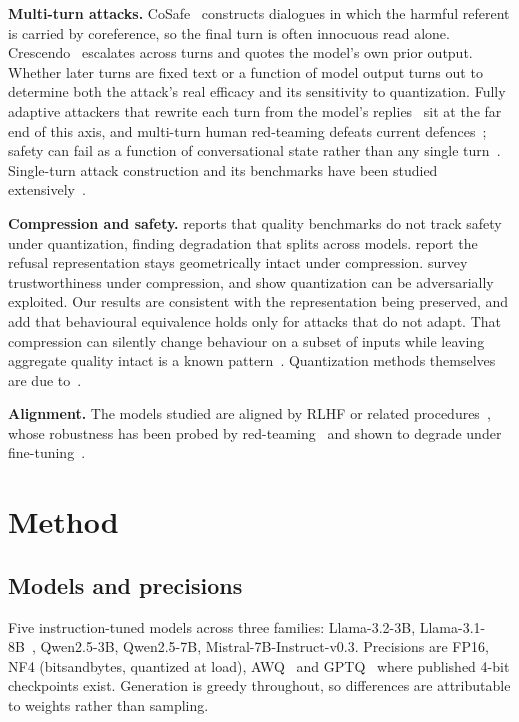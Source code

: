 \documentclass[10pt,twocolumn]{article}
\begin{document}
\textbf{Multi-turn attacks.} CoSafe~\citep{yu2024cosafe} constructs dialogues in
which the harmful referent is carried by coreference, so the final turn is often
innocuous read alone. Crescendo~\citep{russinovich2024crescendo} escalates across
turns and quotes the model's own prior output. Whether later turns are fixed
text or a function of model output turns out to determine both the attack's real
efficacy and its sensitivity to quantization. Fully adaptive attackers that
rewrite each turn from the model's replies~\citep{mehrotra2024tree,andriushchenko2024jailbreaking,ren2024actorattack}
sit at the far end of this axis, and multi-turn human red-teaming defeats current
defences~\citep{li2024multiturn,yang2024chainofattack}; safety can fail as a
function of conversational state rather than any single turn~\citep{star2026state}.
Single-turn attack construction and its benchmarks have been studied
extensively~\citep{zou2023universal,chao2023jailbreaking,liu2024autodan,wei2023jailbroken,chao2024jailbreakbench}.

\textbf{Compression and safety.} \citet{kadadekar2026quality} reports
that quality benchmarks do not track safety under quantization, finding
degradation that splits across models. \citet{chhabra2025refusal} report the
refusal representation stays geometrically intact under compression.
\citet{hong2024decoding} survey trustworthiness under compression, and
\citet{egashira2024exploiting} show quantization can be adversarially
exploited. Our results are consistent with the representation being preserved,
and add that behavioural equivalence holds only for attacks that do not adapt.
That compression can silently change behaviour on a subset of inputs while
leaving aggregate quality intact is a known
pattern~\citep{hooker2019compressed,hooker2020characterising}. Quantization methods
themselves are due
to~\citep{frantar2023gptq,lin2024awq,dettmers2023qlora,dettmers2022llmint8,xiao2023smoothquant}.

\textbf{Alignment.} The models studied are aligned by RLHF or related
procedures~\citep{ouyang2022training,bai2022constitutional}, whose robustness has
been probed by red-teaming~\citep{ganguli2022red,perez2022red} and shown to
degrade under fine-tuning~\citep{qi2024finetuning}.

\section{Method}

\subsection{Models and precisions}
Five instruction-tuned models across three families: Llama-3.2-3B,
Llama-3.1-8B~\citep{dubey2024llama}, Qwen2.5-3B, Qwen2.5-7B,
Mistral-7B-Instruct-v0.3. Precisions are
FP16, NF4 (bitsandbytes, quantized at load), AWQ~\citep{lin2024awq} and
GPTQ~\citep{frantar2023gptq} where published 4-bit checkpoints exist. Generation
is greedy throughout, so differences are attributable to weights rather than
sampling.
\end{document}
